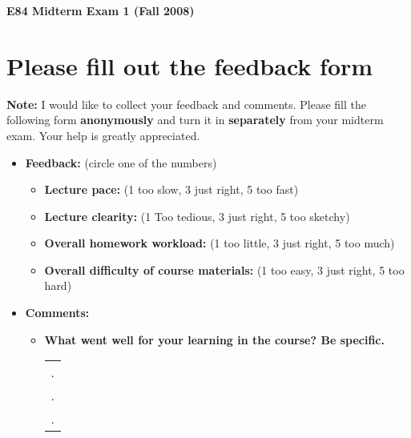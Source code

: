\usepackage{html}

\begin{center}
{\Large \bf  E84 Midterm Exam 1 (Fall 2008)}
\end{center}

\section*{Please fill out the feedback form}

{\bf Note: } I would like to collect your feedback and comments. Please fill
the following form {\bf anonymously} and turn it in {\bf separately} from your 
midterm exam. Your help is greatly appreciated.

\begin{itemize}
\item {\bf Feedback:} (circle one of the numbers)
\begin{itemize}

\item {\bf Lecture pace:} (1 too slow, 3 just right, 5 too fast)


\item {\bf Lecture clearity:} (1 Too tedious, 3 just right, 5 too sketchy)


\item {\bf Overall homework workload:} (1 too little, 3 just right, 5 too much)


\item {\bf Overall difficulty of course materials:} (1 too easy, 3 just right, 5 too hard)

\end{itemize} 

\item {\bf Comments:}
\begin{itemize}

\item {\bf What went well for your learning in the course? Be specific.}

\begin{tabular}{l}
.  \\
.  \\
.  \\
\end{tabular}
\vskip 5cm


\end{itemize}
\end{itemize}
